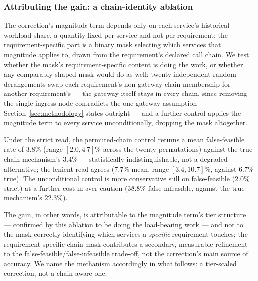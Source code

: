 \documentclass[journal, 10pt]{IEEEtran}
\begin{document}
\subsubsection{Attributing the gain: a chain-identity ablation}
\label{sec:rq-decision-ablation}
The correction's magnitude term depends only on each service's historical
workload share, a quantity fixed per service and not per requirement; the
requirement-specific part is a binary mask selecting which services that
magnitude applies to, drawn from the requirement's declared call chain. We
test whether the mask's requirement-specific content is doing the work, or
whether any comparably-shaped mask would do as well: twenty independent
random derangements swap each requirement's non-gateway chain membership for
another requirement's --- the gateway itself stays in every chain, since
removing the single ingress node contradicts the one-gateway assumption
Section~\ref{sec:methodology} states outright --- and a further control
applies the magnitude term to every service unconditionally, dropping the
mask altogether.

Under the strict read, the permuted-chain control returns a mean
false-feasible rate of $3.8\%$ (range $[2.0,4.7]\%$ across the twenty
permutations) against the true-chain mechanism's $3.4\%$ --- statistically
indistinguishable, not a degraded alternative; the lenient read agrees
($7.7\%$ mean, range $[3.4,10.7]\%$, against $6.7\%$ true). The unconditional
control is more conservative still on false-feasible ($2.0\%$ strict) at a
further cost in over-caution ($38.8\%$ false-infeasible, against the true
mechanism's $22.3\%$).

The gain, in other words, is attributable to the magnitude term's tier
structure --- confirmed by this ablation to be doing the load-bearing work ---
and not to the mask correctly identifying which services a \emph{specific}
requirement touches; the requirement-specific chain mask contributes a
secondary, measurable refinement to the false-feasible/false-infeasible
trade-off, not the correction's main source of accuracy. We name the
mechanism accordingly in what follows: a tier-scaled correction, not a
chain-aware one.
\end{document}
